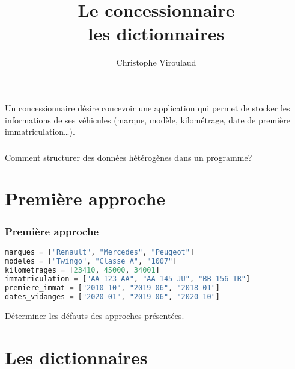 \documentclass[svgnames,11pt]{beamer}
\author[]{Christophe Viroulaud}
\title{Le concessionnaire\\les dictionnaires}
\date{\framebox{\textbf{DonRep 08}}}
\institute{Première - NSI}
\begin{document}
\begin{frame}
    \titlepage
\end{frame}
\begin{frame}
    \frametitle{}

    Un concessionnaire désire concevoir une application qui permet de stocker les informations de ses véhicules (marque, modèle, kilométrage, date de première immatriculation\dots).

\end{frame}
\begin{frame}
    \frametitle{}

    \begin{framed}
        \centering Comment structurer des données hétérogènes dans un programme?
    \end{framed}

\end{frame}
\section{Première approche}
\begin{frame}[fragile]
    \frametitle{Première approche}

    \begin{center}
        \begin{lstlisting}[language=Python , basicstyle=\ttfamily\small, xleftmargin=1em, xrightmargin=0em]
marques = ["Renault", "Mercedes", "Peugeot"]
modeles = ["Twingo", "Classe A", "1007"]
kilometrages = [23410, 45000, 34001]
immatriculation = ["AA-123-AA", "AA-145-JU", "BB-156-TR"]
premiere_immat = ["2010-10", "2019-06", "2018-01"]
dates_vidanges = ["2020-01", "2019-06", "2020-10"]
\end{lstlisting}
        \label{CODE}
    \end{center}
    \begin{activite}
        Déterminer les défauts des approches présentées.
    \end{activite}
\end{frame}
\section{Les dictionnaires}
\end{document}

